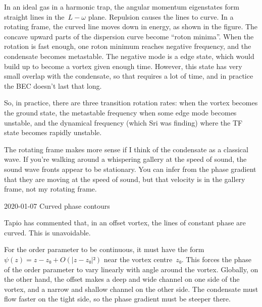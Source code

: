 In an ideal gas in a harmonic trap, the angular momentum eigenstates form straight lines in the~$L-ω$ plane.  Repulsion causes the lines to curve.  In a rotating frame, the curved line moves down in energy, as shown in the figure.  The concave upward parts of the dispersion curve become “roton minima”.  When the rotation is fast enough, one roton minimum reaches negative frequency, and the condensate becomes metastable.  The negative mode is a edge state, which would build up to become a vortex given enough time.  However, this state has very small overlap with the condensate, so that requires a lot of time, and in practice the BEC doesn't last that long.

So, in practice, there are three transition rotation rates: when the vortex becomes the ground state, the metastable frequency when some edge mode becomes unstable, and the dynamical frequency (which Sri was finding) where the TF state becomes rapidly unstable.

The rotating frame makes more sense if I think of the condensate as a classical wave.  If you're walking around a whispering gallery at the speed of sound, the sound wave fronts appear to be stationary.  You can infer from the phase gradient that they are moving at the speed of sound, but that velocity is in the gallery frame, not my rotating frame.

2020-01-07 Curved phase contours

Tapio has commented that, in an offset vortex, the lines of constant
phase are curved.  This is unavoidable.

For the order parameter to be continuous, it must have the
form~$ψ(z)=z-z₀+O(|z-z₀|²)$ near the vortex centre~$z₀$.  This
forces the phase of the order parameter to vary linearly with angle
around the vortex.  Globally, on the other hand, the offset makes
a deep and wide channel on one side of the vortex, and a narrow and
shallow channel on the other side.  The condensate must flow faster
on the tight side, so the phase gradient must be steeper there.

\bye